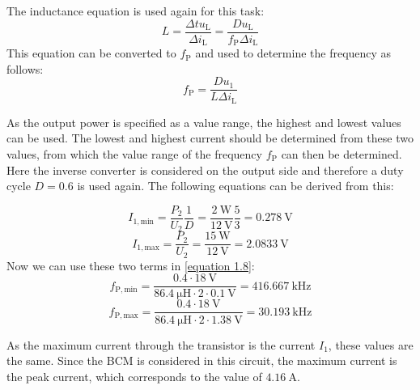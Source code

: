  \begin{solutionblock}
     The inductance equation is used again for this task:
     \begin{equation}
        L = \frac{\Delta t  u_{\mathrm{L}}}{\Delta i_{\mathrm{L}}}= \frac{D u_{\mathrm{L}}}{f_\mathrm{P}\Delta i_{\mathrm{L}}}
     \end{equation}
     This equation can be converted to $f_\mathrm{P}$ and used to determine the frequency as follows:
     \begin{equation}
        f_\mathrm{P} = \frac{Du_{\mathrm{1}}}{L\Delta i_{\mathrm{L}}} \label{equation 1.8}
     \end{equation}
      
As the output power is specified as a value range, the highest and lowest values can be used. The lowest and highest current should be determined from these two values, from which the value range of the frequency $f_\mathrm{P}$ can then be determined. Here the inverse converter is considered on the output side and therefore a duty cycle $D = 0.6$ is used again. The following equations can be derived from this:

     \begin{equation}
        I_\mathrm{1,min}= \frac{P_\mathrm{2}}{U_\mathrm{2}}\frac{1}{D}=\frac{\SI{2}{\watt}}{\SI{12}{\volt}}\frac{5}{3}=\SI{0.278}{\volt}
     \end{equation}
     \begin{equation}
        I_\mathrm{1,max}= \frac{P_\mathrm{2}}{U_\mathrm{2}}=\frac{\SI{15}{\watt}}{\SI{12}{\volt}}=\SI{2.0833}{\volt}
     \end{equation}
     Now we can use these two terms in \ref{equation 1.8}:
     \begin{equation}
        f_\mathrm{P,min}=\frac{0.4\cdot\SI{18}{\volt}}{\SI{86.4}{\micro\henry}\cdot 2\cdot \SI{0.1}{\volt}}=\SI{416.667}{\kilo \hertz}
     \end{equation}
     \begin{equation}
        f_\mathrm{P,max}=\frac{0.4\cdot\SI{18}{\volt}}{\SI{86.4}{\micro\henry}\cdot 2\cdot \SI{1.38}{\volt}}=\SI{30.193}{\kilo \hertz}
     \end{equation}
 \end{solutionblock}

 \begin{solutionblock}
    As the maximum current through the transistor is the current $I_1$, these values are the same. Since the BCM is considered in this circuit, the maximum current is the peak current, which corresponds to the value of $\SI{4.16}{\ampere}$.
 \end{solutionblock}


